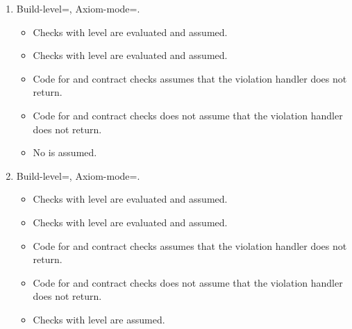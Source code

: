 \begin{enumerate}
\item Build-level=, Axiom-mode=.
\begin{itemize}
  \item Checks with  level are evaluated and assumed.
  \item Checks with  level are evaluated and assumed.
  \item Code for  and  contract checks 
	  assumes that the violation handler does not return.
  \item Code for  and  contract 
	  checks does not assume that the violation handler does not return.
  \item No  is assumed.
\end{itemize}

\item Build-level=, Axiom-mode=.
\begin{itemize}
  \item Checks with  level are evaluated and assumed.
  \item Checks with  level are evaluated and assumed.
  \item Code for  and  contract checks 
	  assumes that the violation handler does not return.
  \item Code for  and  contract 
	  checks does not assume that the violation handler does not return.
  \item Checks with  level are assumed.
\end{itemize}

\end{enumerate}
